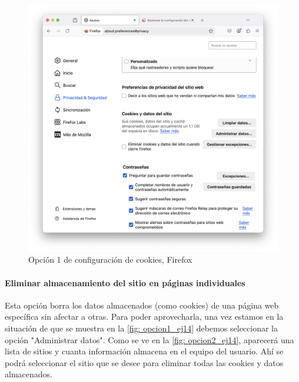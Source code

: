 \begin{figure}[H]   
    \includegraphics[width=15cm]{opcion1_ej14.png}
    \caption{Opción 1 de configuración de cookies, Firefox}
    \label{fig:opcion1_ej14}
\end{figure}


\paragraph{Eliminar almacenamiento del sitio en páginas individuales }

Esta opción borra los datos almacenados (como cookies) de una página web específica sin afectar a otras. Para poder aprovecharla, una vez estamos en la situación de que se muestra en la \ref{fig: opcion1_ej14} debemos seleccionar la opción "Administrar datos". Como se ve en la \ref{fig: opcion2_ej14}, aparecerá una lista de sitios y cuanta información almacena en el equipo del usuario. Ahí se podrá seleccionar el sitio que se desee para eliminar todas las cookies y datos almacenados. 

